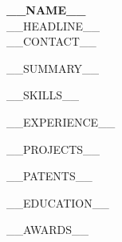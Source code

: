 \documentclass[letterpaper,10pt]{article}
\begin{document}
\begin{center}
  {\LARGE\bfseries __NAME__}\\[2pt]
  {\large __HEADLINE__}\\[4pt]
  \small
  __CONTACT__
\end{center}

__SUMMARY__

__SKILLS__

__EXPERIENCE__

__PROJECTS__

__PATENTS__

__EDUCATION__

__AWARDS__
\end{document}

